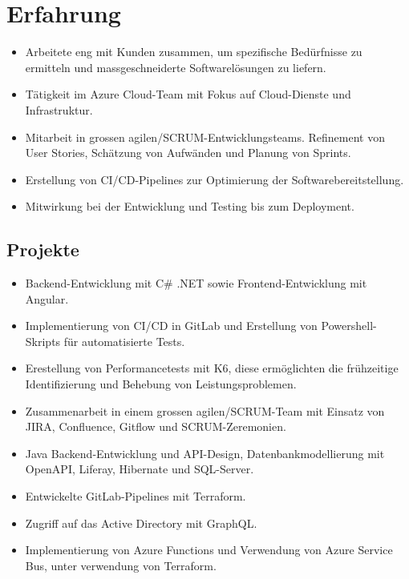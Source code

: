 \section{Erfahrung}
\begin{itemize}
\item Arbeitete eng mit Kunden zusammen, um spezifische Bedürfnisse zu ermitteln und massgeschneiderte Softwarelösungen zu liefern.
\item Tätigkeit im Azure Cloud-Team mit Fokus auf Cloud-Dienste und Infrastruktur.
\item Mitarbeit in grossen agilen/SCRUM-Entwicklungsteams. Refinement von User Stories, Schätzung von Aufwänden und Planung von Sprints.
\item Erstellung von CI/CD-Pipelines zur Optimierung der Softwarebereitstellung.
\item Mitwirkung bei der Entwicklung und Testing bis zum Deployment.
\end{itemize}
\subsection*{Projekte}
\begin{itemize}
\item Backend-Entwicklung mit C\# .NET sowie Frontend-Entwicklung mit Angular.
\item Implementierung von CI/CD in GitLab und Erstellung von Powershell-Skripts für automatisierte Tests.
\item Erestellung von Performancetests mit K6, diese ermöglichten die frühzeitige Identifizierung und Behebung von Leistungsproblemen.
\end{itemize}
\dottedline
{}
\begin{itemize}
\item Zusammenarbeit in einem grossen agilen/SCRUM-Team mit Einsatz von JIRA, Confluence, Gitflow und SCRUM-Zeremonien.
\item Java Backend-Entwicklung und API-Design, Datenbankmodellierung mit OpenAPI, Liferay, Hibernate und SQL-Server.
\end{itemize}
\dottedline
{}
\begin{itemize}
\item Entwickelte GitLab-Pipelines mit Terraform.
\item Zugriff auf das Active Directory mit GraphQL.
\item Implementierung von Azure Functions und Verwendung von Azure Service Bus, unter verwendung von Terraform.
\end{itemize}

